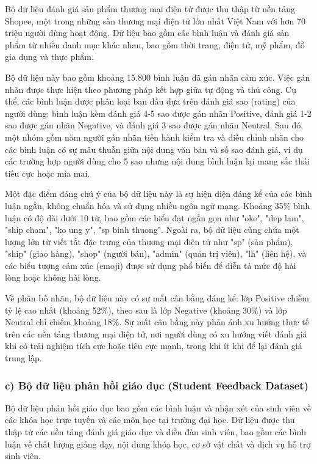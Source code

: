 \documentclass[14pt, a4paper]{report}
\begin{document}
Bộ dữ liệu đánh giá sản phẩm thương mại điện tử được thu thập từ nền tảng Shopee, một trong những sàn thương mại điện tử lớn nhất Việt Nam với hơn 70 triệu người dùng hoạt động. Dữ liệu bao gồm các bình luận và đánh giá sản phẩm từ nhiều danh mục khác nhau, bao gồm thời trang, điện tử, mỹ phẩm, đồ gia dụng và thực phẩm.


Bộ dữ liệu này bao gồm khoảng 15.800 bình luận đã gán nhãn cảm xúc. Việc gán nhãn được thực hiện theo phương pháp kết hợp giữa tự động và thủ công. Cụ thể, các bình luận được phân loại ban đầu dựa trên đánh giá sao (rating) của người dùng: bình luận kèm đánh giá 4-5 sao được gán nhãn Positive, đánh giá 1-2 sao được gán nhãn Negative, và đánh giá 3 sao được gán nhãn Neutral. Sau đó, một nhóm gồm năm người gán nhãn tiến hành kiểm tra và điều chỉnh nhãn cho các bình luận có sự mâu thuẫn giữa nội dung văn bản và số sao đánh giá, ví dụ các trường hợp người dùng cho 5 sao nhưng nội dung bình luận lại mang sắc thái tiêu cực hoặc mỉa mai.


Một đặc điểm đáng chú ý của bộ dữ liệu này là sự hiện diện đáng kể của các bình luận ngắn, không chuẩn hóa và sử dụng nhiều ngôn ngữ mạng. Khoảng 35\% bình luận có độ dài dưới 10 từ, bao gồm các biểu đạt ngắn gọn như "oke", "dep lam", "ship cham", "ko ung y", "sp binh thuong". Ngoài ra, bộ dữ liệu cũng chứa một lượng lớn từ viết tắt đặc trưng của thương mại điện tử như "sp" (sản phẩm), "ship" (giao hàng), "shop" (người bán), "admin" (quản trị viên), "lh" (liên hệ), và các biểu tượng cảm xúc (emoji) được sử dụng phổ biến để diễn tả mức độ hài lòng hoặc không hài lòng.


Về phân bố nhãn, bộ dữ liệu này có sự mất cân bằng đáng kể: lớp Positive chiếm tỷ lệ cao nhất (khoảng 52\%), theo sau là lớp Negative (khoảng 30\%) và lớp Neutral chỉ chiếm khoảng 18\%. Sự mất cân bằng này phản ánh xu hướng thực tế trên các nền tảng thương mại điện tử, nơi người dùng có xu hướng viết đánh giá khi có trải nghiệm tích cực hoặc tiêu cực mạnh, trong khi ít khi để lại đánh giá trung lập.


\subsubsection{c) Bộ dữ liệu phản hồi giáo dục (Student Feedback Dataset)}


Bộ dữ liệu phản hồi giáo dục bao gồm các bình luận và nhận xét của sinh viên về các khóa học trực tuyến và các môn học tại trường đại học. Dữ liệu được thu thập từ các nền tảng đánh giá giáo dục và diễn đàn sinh viên, bao gồm các bình luận về chất lượng giảng dạy, nội dung khóa học, cơ sở vật chất và dịch vụ hỗ trợ sinh viên.
\end{document}
